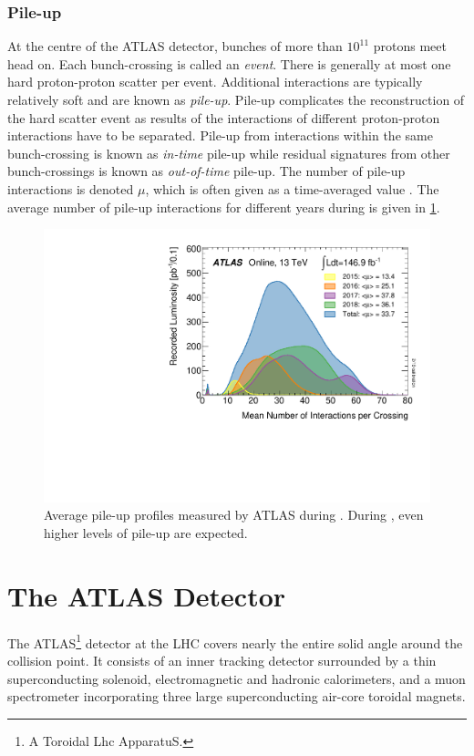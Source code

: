 \subsubsection{Pile-up}

At the centre of the ATLAS detector, bunches of more than $10^{11}$ protons meet head on.
Each bunch-crossing is called an \textit{event}.
There is generally at most one hard proton-proton scatter per event.
Additional interactions are typically relatively soft and are known as \textit{pile-up}.
Pile-up complicates the reconstruction of the hard scatter event as results of the interactions of different proton-proton interactions have to be separated.
Pile-up from interactions within the same bunch-crossing is known as \textit{in-time} pile-up while residual signatures from other bunch-crossings is known as \textit{out-of-time} pile-up.
The number of pile-up interactions is denoted $\mu$, which is often given as a time-averaged value \angles{\mu}.
The average number of pile-up interactions for different years during \runtwo is given in \cref{fig:run2_pile-up}.
%
\begin{figure}[!htbp]
  \centering
  \includegraphics[width=0.6\linewidth]{chapters/2.detector/figs/mu_2015_2018.pdf}
  \caption{
    Average pile-up profiles measured by ATLAS during \runtwo \cite{atlas-lumi-run2}.
    During \runthree, even higher levels of pile-up are expected.
  }
  \label{fig:run2_pile-up}
\end{figure}
%


\section{The ATLAS Detector}\label{sec:atlas_detector}

The ATLAS\footnote{A Toroidal Lhc ApparatuS.} detector at the LHC covers nearly the entire solid angle around the collision point.
It consists of an inner tracking detector surrounded by a thin superconducting solenoid, electromagnetic and hadronic calorimeters,
and a muon spectrometer incorporating three large superconducting air-core toroidal magnets.

